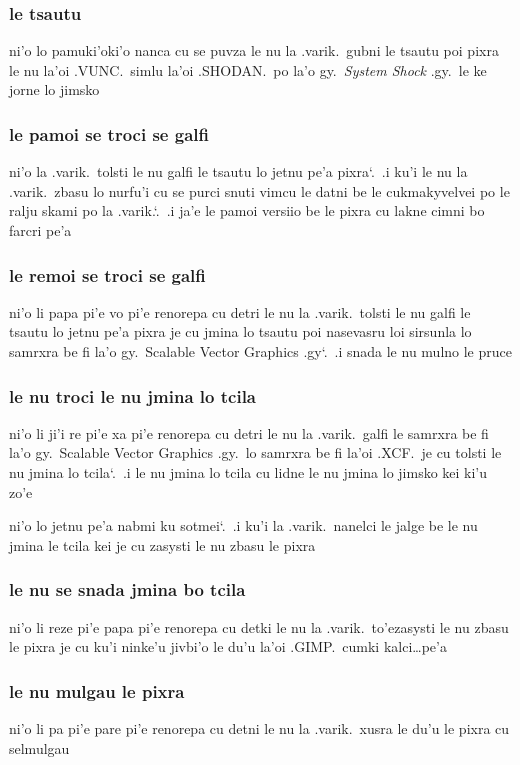 \documentclass{report}
\newcommand\sds{\spacefactor\sfcode`.\ \space}
\begin{document}
\subsubsection{le tsautu}
ni'o lo pamuki'oki'o nanca cu se puvza le nu la .varik.\ gubni le tsautu poi pixra le nu la'oi .VUNC.\ simlu la'oi .SHODAN.\ po la'o gy.\ \textit{System Shock} .gy.\ le ke jorne lo jimsko

\subsubsection{le pamoi se troci se galfi}
ni'o la .varik.\ tolsti le nu galfi le tsautu lo jetnu pe'a pixra\sds  .i ku'i le nu la .varik.\ zbasu lo nurfu'i cu se purci snuti vimcu le datni be le cukmakyvelvei po le ralju skami po la .varik.\sds  .i ja'e le pamoi versiio be le pixra cu lakne cimni bo farcri pe'a

\subsubsection{le remoi se troci se galfi}
ni'o li papa pi'e vo pi'e renorepa cu detri le nu la .varik.\ tolsti le nu galfi le tsautu lo jetnu pe'a pixra je cu jmina lo tsautu poi nasevasru loi sirsunla lo samrxra be fi la'o gy.\ Scalable Vector Graphics .gy\sds  .i snada le nu mulno le pruce

\subsubsection{le nu troci le nu jmina lo tcila}
ni'o li ji'i re pi'e xa pi'e renorepa cu detri le nu la .varik.\ galfi le samrxra be fi la'o gy.\ Scalable Vector Graphics .gy.\ lo samrxra be fi la'oi .XCF.\ je cu tolsti le nu jmina lo tcila\sds  .i le nu jmina lo tcila cu lidne le nu jmina lo jimsko kei ki'u zo'e

ni'o lo jetnu pe'a nabmi ku sotmei\sds  .i ku'i la .varik.\ nanelci le jalge be le nu jmina le tcila kei je cu zasysti le nu zbasu le pixra

\subsubsection{le nu se snada jmina bo tcila}
ni'o li reze pi'e papa pi'e renorepa cu detki le nu la .varik.\ to'ezasysti le nu zbasu le pixra je cu ku'i ninke'u jivbi'o le du'u la'oi .GIMP.\ cumki kalci\ldots pe'a

\subsubsection{le nu mulgau le pixra}
ni'o li pa pi'e pare pi'e renorepa cu detni le nu la .varik.\ xusra le du'u le pixra cu selmulgau
\end{document}
